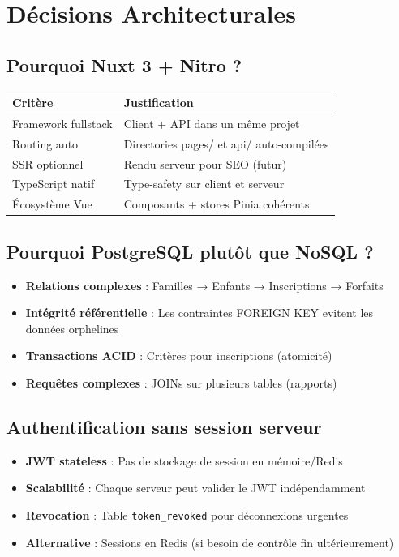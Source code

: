 \documentclass[11pt,a4paper]{article}
\begin{document}
\section{Décisions Architecturales}

\subsection{Pourquoi Nuxt 3 + Nitro ?}

\begin{tabular}{lp{8cm}}
\toprule
\textbf{Critère} & \textbf{Justification} \\
\midrule
Framework fullstack & Client + API dans un même projet \\
Routing auto & Directories pages/ et api/ auto-compilées \\
SSR optionnel & Rendu serveur pour SEO (futur) \\
TypeScript natif & Type-safety sur client et serveur \\
Écosystème Vue & Composants + stores Pinia cohérents \\
\bottomrule
\end{tabular}

\subsection{Pourquoi PostgreSQL plutôt que NoSQL ?}

\begin{itemize}
  \item \textbf{Relations complexes} : Familles → Enfants → Inscriptions → Forfaits
  \item \textbf{Intégrité référentielle} : Les contraintes FOREIGN KEY evitent les données orphelines
  \item \textbf{Transactions ACID} : Critères pour inscriptions (atomicité)
  \item \textbf{Requêtes complexes} : JOINs sur plusieurs tables (rapports)
\end{itemize}

\subsection{Authentification sans session serveur}

\begin{itemize}
  \item \textbf{JWT stateless} : Pas de stockage de session en mémoire/Redis
  \item \textbf{Scalabilité} : Chaque serveur peut valider le JWT indépendamment
  \item \textbf{Revocation} : Table \texttt{token\_revoked} pour déconnexions urgentes
  \item \textbf{Alternative} : Sessions en Redis (si besoin de contrôle fin ultérieurement)
\end{itemize}
\end{document}
